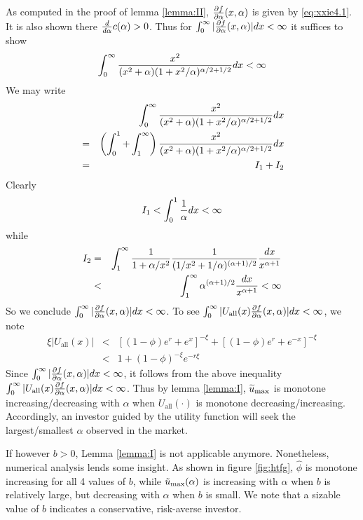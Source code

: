 \begin{subappendices}
As computed in the proof of lemma \ref{lemma:II}, ${\partial f \over \partial
  \alpha}(x, \alpha)$ is given by \eqref{eq:xxie4.1}. It is also shown
there ${d \over d \alpha} c(\alpha) > 0$. Thus for
$\int_0^\infty |{\partial f \over \partial \alpha}(x, \alpha)| dx < \infty$
it suffices to show
\[
\int_ 0^\infty {
x^2
\over
(x^2 + \alpha) (1 + x^2 / \alpha)^{\alpha/2 + 1/2}
} dx < \infty
\]
We may write
\begin{eqnarray*}
&& \int_ 0^\infty {
x^2
\over
(x^2 + \alpha) (1 + x^2 / \alpha)^{\alpha/2 + 1/2}
} dx \\
&=& \left(\int_0^1 + \int_1^\infty \right) {
x^2
\over
(x^2 + \alpha) (1 + x^2 / \alpha)^{\alpha/2 + 1/2}
} dx \\
&=& I_1 + I_2
\end{eqnarray*}
Clearly
\[
I_1 < \int_0^1 {1 \over \alpha} dx < \infty
\]
while
\begin{eqnarray*}
  I_2 &=& \int_1^\infty {1 \over 1 + \alpha/x^2}
  {1 \over (1/x^2 + 1/\alpha)^{(\alpha+1) / 2}} {dx \over x^{\alpha +
      1}} \\
  &<& \int_1^\infty \alpha^{(\alpha+1) / 2} {dx \over x^{\alpha + 1}}
  < \infty
\end{eqnarray*}
So we conclude
$\int_0^\infty |{\partial f \over \partial \alpha}(x, \alpha)| dx < \infty$.
To see
$\int_0^\infty |U_{\text{all}}(x){\partial f \over \partial \alpha}(x, \alpha)| dx < \infty$, we note
\begin{eqnarray*}
  \xi |U_{\text{all}}(x)|
  &<& [(1 - \phi) e^r + e^x]^{-\xi} + [(1 - \phi) e^r + e^{-x}]^{-\xi} \\
  &<& 1 + (1 - \phi)^{-\xi} e^{-r \xi}
\end{eqnarray*}
Since $\int_0^\infty |{\partial f \over \partial \alpha}(x, \alpha)| dx < \infty$,
it follows from the above inequality $\int_0^\infty |U_{\text{all}}(x){\partial f \over \partial \alpha}(x, \alpha)| dx < \infty$.
Thus by lemma \ref{lemma:I}, $\widetilde u_{\rm max}$ is monotone
increasing/decreasing with $\alpha$ when $U_{\text{all}}(\cdot)$ is
monotone decreasing/increasing. Accordingly, an investor guided by the
utility function will seek the largest/smallest $\alpha$ observed in
the market.

If however $b > 0$, Lemma \ref{lemma:I} is not applicable
anymore. Nonetheless, numerical analysis lends some insight.
As shown in figure \ref{fig:htfg}, $\hat\phi$ is monotone increasing
for all 4 values of $b$, while $\tilde u_{\rm max}(\alpha)$ is
increasing with $\alpha$ when $b$ is relatively large, but
decreasing with $\alpha$ when $b$ is small. We note that a sizable
value of $b$ indicates a conservative, risk-averse investor.


\end{subappendices}
